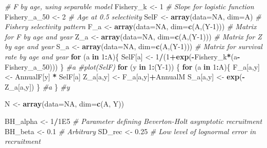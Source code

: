 \documentclass[
]{krantz}
\makeatletter
\newenvironment{Shaded}{\begin{snugshade}}{\end{snugshade}}
\newcommand{\AttributeTok}[1]{\textcolor[rgb]{0.27,0.27,0.27}{#1}}
\newcommand{\CommentTok}[1]{\textcolor[rgb]{0.37,0.37,0.37}{\textit{#1}}}
\newcommand{\ConstantTok}[1]{\textcolor[rgb]{0.37,0.37,0.37}{#1}}
\newcommand{\ControlFlowTok}[1]{\textcolor[rgb]{0.27,0.27,0.27}{\textbf{#1}}}
\newcommand{\DecValTok}[1]{\textcolor[rgb]{0.06,0.06,0.06}{#1}}
\newcommand{\FloatTok}[1]{\textcolor[rgb]{0.06,0.06,0.06}{#1}}
\newcommand{\FunctionTok}[1]{\textcolor[rgb]{0.27,0.27,0.27}{\textbf{#1}}}
\newcommand{\NormalTok}[1]{#1}
\newcommand{\OtherTok}[1]{\textcolor[rgb]{0.37,0.37,0.37}{#1}}
\newcommand{\SpecialCharTok}[1]{\textcolor[rgb]{0.43,0.43,0.43}{\textbf{#1}}}
\newenvironment{kframe}{%
\medskip{}
\setlength{\fboxsep}{.8em}
 \def\at@end@of@kframe{}%
 \ifinner\ifhmode%
  \def\at@end@of@kframe{\end{minipage}}%
  \begin{minipage}{\columnwidth}%
 \fi\fi%
 \def\FrameCommand##1{\hskip\@totalleftmargin \hskip-\fboxsep
 \colorbox{shadecolor}{##1}\hskip-\fboxsep
     \hskip-\linewidth \hskip-\@totalleftmargin \hskip\columnwidth}%
 \MakeFramed {\advance\hsize-\width
   \@totalleftmargin\z@ \linewidth\hsize
   \@setminipage}}%
 {\par\unskip\endMakeFramed%
 \at@end@of@kframe}
\renewenvironment{Shaded}{\begin{kframe}}{\end{kframe}}
\makeatother
\begin{document}
\begin{Shaded}
\begin{Highlighting}[]
\CommentTok{\# F by age, using separable model}
\NormalTok{Fishery\_k }\OtherTok{\textless{}{-}} \DecValTok{1} \CommentTok{\# Slope for logistic function}
\NormalTok{Fishery\_a\_50 }\OtherTok{\textless{}{-}} \DecValTok{2} \CommentTok{\# Age at 0.5 selectivity}
\NormalTok{SelF }\OtherTok{\textless{}{-}} \FunctionTok{array}\NormalTok{(}\AttributeTok{data=}\ConstantTok{NA}\NormalTok{, }\AttributeTok{dim=}\NormalTok{A) }\CommentTok{\# Fishery selectivity pattern}
\NormalTok{F\_a }\OtherTok{\textless{}{-}} \FunctionTok{array}\NormalTok{(}\AttributeTok{data=}\ConstantTok{NA}\NormalTok{, }\AttributeTok{dim=}\FunctionTok{c}\NormalTok{(A,(Y}\DecValTok{{-}1}\NormalTok{))) }\CommentTok{\# Matrix for F by age and year}
\NormalTok{Z\_a }\OtherTok{\textless{}{-}} \FunctionTok{array}\NormalTok{(}\AttributeTok{data=}\ConstantTok{NA}\NormalTok{, }\AttributeTok{dim=}\FunctionTok{c}\NormalTok{(A,(Y}\DecValTok{{-}1}\NormalTok{))) }\CommentTok{\# Matrix for Z by age and year}
\NormalTok{S\_a }\OtherTok{\textless{}{-}} \FunctionTok{array}\NormalTok{(}\AttributeTok{data=}\ConstantTok{NA}\NormalTok{, }\AttributeTok{dim=}\FunctionTok{c}\NormalTok{(A,(Y}\DecValTok{{-}1}\NormalTok{))) }\CommentTok{\# Matrix for survival rate by age and year}
\ControlFlowTok{for}\NormalTok{ (a }\ControlFlowTok{in} \DecValTok{1}\SpecialCharTok{:}\NormalTok{A)\{}
\NormalTok{  SelF[a] }\OtherTok{\textless{}{-}} \DecValTok{1}\SpecialCharTok{/}\NormalTok{(}\DecValTok{1}\SpecialCharTok{+}\FunctionTok{exp}\NormalTok{(}\SpecialCharTok{{-}}\NormalTok{Fishery\_k}\SpecialCharTok{*}\NormalTok{(a}\SpecialCharTok{{-}}\NormalTok{Fishery\_a\_50)))}
\NormalTok{  \} }\CommentTok{\#a}
\CommentTok{\#plot(SelF)}
\ControlFlowTok{for}\NormalTok{ (y }\ControlFlowTok{in} \DecValTok{1}\SpecialCharTok{:}\NormalTok{(Y}\DecValTok{{-}1}\NormalTok{)) \{}
  \ControlFlowTok{for}\NormalTok{ (a }\ControlFlowTok{in} \DecValTok{1}\SpecialCharTok{:}\NormalTok{A)\{}
\NormalTok{    F\_a[a,y] }\OtherTok{\textless{}{-}}\NormalTok{ AnnualF[y] }\SpecialCharTok{*}\NormalTok{ SelF[a]}
\NormalTok{    Z\_a[a,y] }\OtherTok{\textless{}{-}}\NormalTok{ F\_a[a,y]}\SpecialCharTok{+}\NormalTok{AnnualM}
\NormalTok{    S\_a[a,y] }\OtherTok{\textless{}{-}} \FunctionTok{exp}\NormalTok{(}\SpecialCharTok{{-}}\NormalTok{Z\_a[a,y])}
\NormalTok{  \} }\CommentTok{\#a}
\NormalTok{\} }\CommentTok{\#y}

\NormalTok{N }\OtherTok{\textless{}{-}} \FunctionTok{array}\NormalTok{(}\AttributeTok{data=}\ConstantTok{NA}\NormalTok{, }\AttributeTok{dim=}\FunctionTok{c}\NormalTok{(A, Y))}

\NormalTok{BH\_alpha }\OtherTok{\textless{}{-}} \DecValTok{1}\SpecialCharTok{/}\FloatTok{1E5} \CommentTok{\# Parameter defining Beverton{-}Holt asymptotic recruitment}
\NormalTok{BH\_beta }\OtherTok{\textless{}{-}} \FloatTok{0.1} \CommentTok{\# Arbitrary}
\NormalTok{SD\_rec }\OtherTok{\textless{}{-}} \FloatTok{0.25} \CommentTok{\# Low level of lognormal error in recruitment}


\end{Highlighting}
\end{Shaded}
\end{document}
